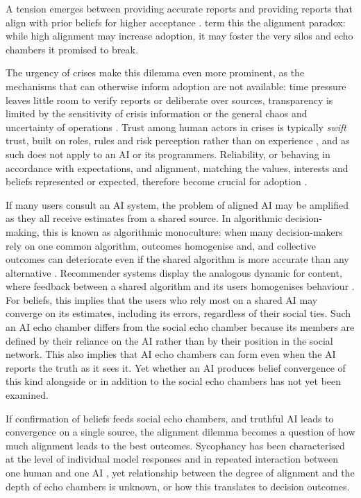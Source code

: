 \documentclass[pdflatex,sn-basic]{sn-jnl}
\begin{document}
A tension emerges between providing accurate reports and providing reports that align with prior beliefs for higher acceptance \citep{ekstrom2022self,sharma2024generative}. 
\citet{west2025alignment} term this the alignment paradox: while high alignment may increase adoption, it may foster the very silos and echo chambers it promised to break.
 
The urgency of crises make this dilemma even more prominent, as the mechanisms that can otherwise inform adoption are not available: time pressure leaves little room to verify reports or deliberate over sources, transparency is limited by the sensitivity of crisis information or the general chaos and uncertainty of operations \citep{tzachor2020artificial,visave2025transparency}. Trust among human actors in crises is typically \textit{swift} trust, built on roles, rules and risk perception rather than on experience \citep{tatham2010application}, and as such does not apply to an AI or its programmers. Reliability, or behaving in accordance with expectations, and alignment, matching the values, interests and beliefs represented or expected, therefore become crucial for adoption
\citep{glikson2020human, lee2004trust}. 
 
If many users consult an AI system, the problem of aligned AI may be amplified as they all receive estimates from a shared source. In algorithmic decision-making, this is
known as algorithmic monoculture: when many decision-makers rely on one common algorithm, outcomes homogenise and, and collective outcomes can deteriorate even if the shared algorithm is more accurate than any
alternative \citep{kleinberg2021monoculture, bommasani2022picking}.
Recommender systems display the analogous dynamic for content, where feedback between a shared algorithm and its users homogenises behaviour
\citep{chaney2018algorithmic}. For beliefs, this implies that the users who rely most on a shared AI may converge on its estimates,
including its errors, regardless of their social ties. Such an AI echo chamber differs from the social echo chamber because its
members are defined by their reliance on the AI rather than by their position in the social network. This also implies that AI echo chambers can form even when the AI reports
the truth as it sees it. Yet whether an AI produces belief convergence of this kind alongside or in addition to the social echo chambers has not yet been examined.
 
If confirmation of beliefs feeds social echo chambers, and truthful AI leads to convergence on a single source, the alignment dilemma becomes a question of how much alignment leads to the best outcomes. Sycophancy has been characterised at the level of individual model responses \citep{sharma2024towards} and in repeated interaction between one human and one AI \citep{glickman2024human, cheng2026sycophantic}, yet relationship between the degree of alignment and the depth of echo chambers is unknown, or how this translates to decision outcomes. 
\end{document}
